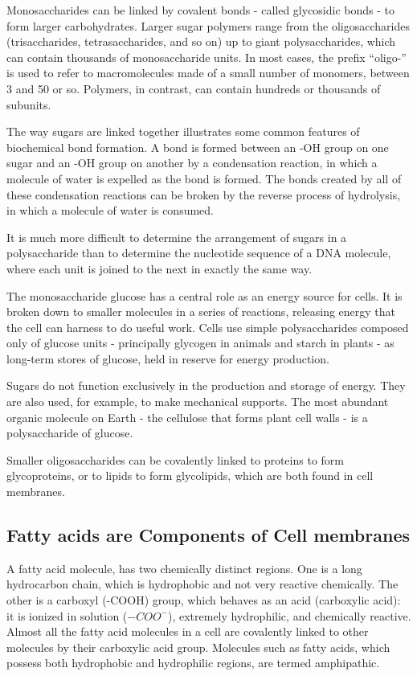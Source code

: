 Monosaccharides can be linked by covalent bonds - called glycosidic
bonds - to form larger carbohydrates.
Larger sugar polymers range from the oligosaccharides (trisaccharides, tetrasaccharides, and so on) up to giant
polysaccharides, which can contain thousands of monosaccharide units.
In most cases, the prefix “oligo-” is used to refer to macromolecules made
of a small number of monomers, between 3 and 50 or so. Polymers, in
contrast, can contain hundreds or thousands of subunits.

The way sugars are linked together illustrates some common features of
biochemical bond formation. A bond is formed between an -OH group
on one sugar and an -OH group on another by a condensation reaction,
in which a molecule of water is expelled as the bond is formed.
The bonds created by all of these condensation reactions can
be broken by the reverse process of hydrolysis, in which a molecule of
water is consumed.

It is much more
difficult to determine the arrangement of sugars in a polysaccharide than
to determine the nucleotide sequence of a DNA molecule, where each
unit is joined to the next in exactly the same way.

The monosaccharide glucose has a central role as an energy source for
cells. It is broken down to smaller molecules in a series of reactions,
releasing energy that the cell can harness to do useful work.
Cells use simple polysaccharides composed only
of glucose units - principally glycogen in animals and starch in plants - as
long-term stores of glucose, held in reserve for energy production.

Sugars do not function exclusively in the production and storage of
energy. They are also used, for example, to make mechanical supports.
The most abundant organic molecule on Earth - the cellulose that forms
plant cell walls - is a polysaccharide of glucose.

Smaller oligosaccharides can be covalently linked to proteins to form
glycoproteins, or to lipids to form glycolipids,
which are both found in cell membranes.

\subsection{Fatty acids are Components of Cell membranes}

A fatty acid molecule, has two
chemically distinct regions. One is a long hydrocarbon chain, which is
hydrophobic and not very reactive chemically. The other is a carboxyl
(-COOH) group, which behaves as an acid (carboxylic acid): it is ionized
in solution ($-COO^{-}$), extremely hydrophilic, and chemically reactive.
Almost all the fatty acid molecules in a cell are covalently linked to other
molecules by their carboxylic acid group.
Molecules such as fatty acids, which possess both hydrophobic and
hydrophilic regions, are termed amphipathic.

